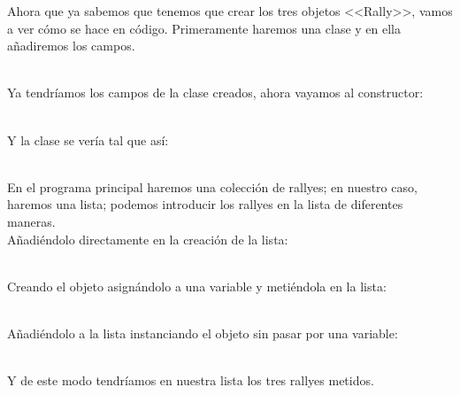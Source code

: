 \documentclass[11pt, oneside]{book}		%
\begin{document}
Ahora que ya sabemos que tenemos que crear los tres objetos <<Rally>>, vamos a ver cómo se hace en código. Primeramente haremos una clase y en ella añadiremos los campos.
\\\\\begin{minipage}[c]{0.95\textwidth}
	
\end{minipage}
Ya tendríamos los campos de la clase creados, ahora vayamos al constructor:
\\\\\begin{minipage}[c]{0.95\textwidth}
	
\end{minipage}
Y la clase se vería tal que así:
\\\\\begin{minipage}[c]{0.95\textwidth}
	
\end{minipage}
En el programa principal haremos una colección de rallyes; en nuestro caso, haremos una lista; podemos introducir los rallyes en la lista de diferentes maneras.\\
Añadiéndolo directamente en la creación de la lista:
\\\\\begin{minipage}[c]{0.95\textwidth}
	
\end{minipage}
Creando el objeto asignándolo a una variable y metiéndola en la lista:
\\\\\begin{minipage}[c]{0.95\textwidth}
	
\end{minipage}
Añadiéndolo a la lista instanciando el objeto sin pasar por una variable:
\\\\\begin{minipage}[c]{0.95\textwidth}
	
\end{minipage}
Y de este modo tendríamos en nuestra lista los tres rallyes metidos.
\end{document}
